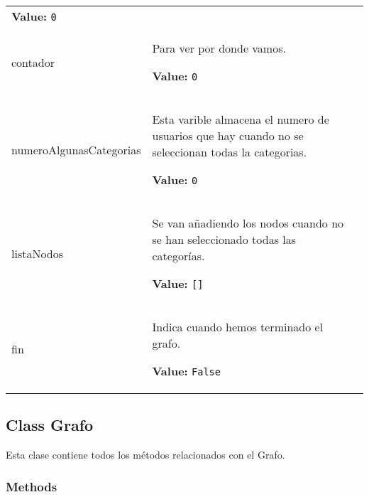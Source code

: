 \begin{longtable}{|p{\varnamewidth}|p{\vardescrwidth}|l}
\textbf{Value:} 
{\tt 0}&\\
\cline{1-2}
\raggedright c\-o\-n\-t\-a\-d\-o\-r\- & \raggedright Para ver por donde vamos.

\textbf{Value:} 
{\tt 0}&\\
\cline{1-2}
\raggedright n\-u\-m\-e\-r\-o\-A\-l\-g\-u\-n\-a\-s\-C\-a\-t\-e\-g\-o\-r\-i\-a\-s\- & \raggedright Esta varible almacena el numero de usuarios que hay cuando no se 
          seleccionan todas la categorias.

\textbf{Value:} 
{\tt 0}&\\
\cline{1-2}
\raggedright l\-i\-s\-t\-a\-N\-o\-d\-o\-s\- & \raggedright Se van añadiendo los nodos cuando no se han seleccionado todas 
          las categorías.

\textbf{Value:} 
{\tt []}&\\
\cline{1-2}
\raggedright f\-i\-n\- & \raggedright Indica cuando hemos terminado el grafo.

\textbf{Value:} 
{\tt False}&\\
\cline{1-2}
\end{longtable}



\subsection{Class Grafo}

    \label{grafo:Grafo}
Esta clase contiene todos los métodos relacionados con el Grafo.



  \subsubsection{Methods}

    \label{grafo:Grafo:setInicio}

    \vspace{0.5ex}

